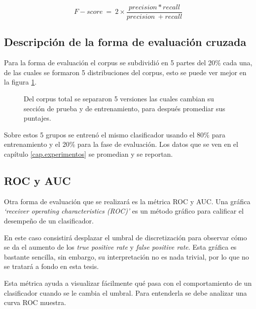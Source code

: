 \begin{figure}[H]
	\centering
	\begin{equation*}
		F-score\ =\ 2 \times  \frac{precision*recall}{precision\ +recall}
	\end{equation*}
\end{figure}

\subsection{Descripción de la forma de evaluación cruzada}

\par Para la forma de evaluación el corpus se subdividió en 5 partes del 20\% cada una, de las cuales se formaron 5 distribuciones del corpus, esto se puede ver mejor en la figura \ref{fig:corpusDiv}.

\begin{figure}[h]
	\centering
	
	\caption{Del corpus total se separaron 5 versiones las cuales cambian su sección de prueba y de entrenamiento, para después promediar sus puntajes.}
	\label{fig:corpusDiv}
\end{figure}

\par Sobre estos 5 grupos se entrenó el mismo clasificador usando el 80\% para entrenamiento y el 20\% para la fase de evaluación. Los datos que se ven en el capítulo \ref{cap.experimentos} se promedian y se reportan.

\subsection{ROC y AUC}

\par Otra forma de evaluación que se realizará es la métrica ROC y AUC. Una gráfica \textit{`receiver operating characteristics (ROC)'} es un método gráfico para calificar el desempeño de un clasificador.
\par En este caso consistirá desplazar el umbral de discretización para observar cómo se da el aumento de los \textit{true positive rate} y \textit{false positive rate}. Esta gráfica es bastante sencilla, sin embargo, su interpretación no es nada trivial, por lo que no se tratará a fondo en esta tesis.

\par Esta métrica ayuda a visualizar fácilmente qué pasa con el comportamiento de un clasificador cuando se le cambia el umbral. Para entenderla se debe analizar una curva ROC muestra.

